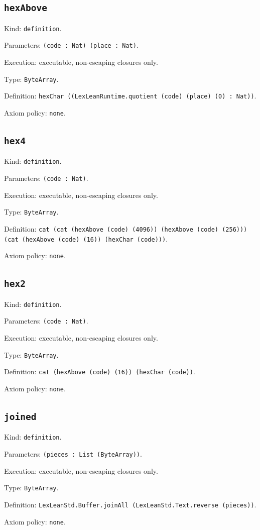 \documentclass[11pt]{article}
\begin{document}
\subsection*{\texttt{hexAbove}}
\noindent Kind: \texttt{definition}.\par
\noindent Parameters: \texttt{(code : Nat) (place : Nat)}.\par
\noindent Execution: executable, non-escaping closures only.\par
\noindent Type: \texttt{ByteArray}.\par
\noindent Definition: \texttt{hexChar ((LexLeanRuntime.quotient (code) (place) (0) : Nat))}.\par
\noindent Axiom policy: \texttt{none}.\par
\subsection*{\texttt{hex4}}
\noindent Kind: \texttt{definition}.\par
\noindent Parameters: \texttt{(code : Nat)}.\par
\noindent Execution: executable, non-escaping closures only.\par
\noindent Type: \texttt{ByteArray}.\par
\noindent Definition: \texttt{cat (cat (hexAbove (code) (4096)) (hexAbove (code) (256))) (cat (hexAbove (code) (16)) (hexChar (code)))}.\par
\noindent Axiom policy: \texttt{none}.\par
\subsection*{\texttt{hex2}}
\noindent Kind: \texttt{definition}.\par
\noindent Parameters: \texttt{(code : Nat)}.\par
\noindent Execution: executable, non-escaping closures only.\par
\noindent Type: \texttt{ByteArray}.\par
\noindent Definition: \texttt{cat (hexAbove (code) (16)) (hexChar (code))}.\par
\noindent Axiom policy: \texttt{none}.\par
\subsection*{\texttt{joined}}
\noindent Kind: \texttt{definition}.\par
\noindent Parameters: \texttt{(pieces : List (ByteArray))}.\par
\noindent Execution: executable, non-escaping closures only.\par
\noindent Type: \texttt{ByteArray}.\par
\noindent Definition: \texttt{LexLeanStd.Buffer.joinAll (LexLeanStd.Text.reverse (pieces))}.\par
\noindent Axiom policy: \texttt{none}.\par
\end{document}
